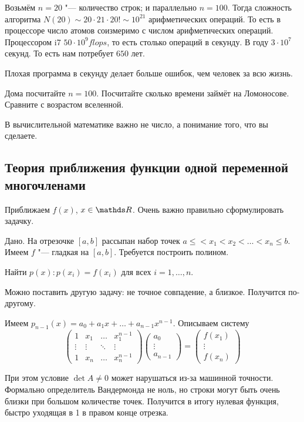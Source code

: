 Возьмём $n=20$ "--- количество строк; и параллельно $n=100$. Тогда сложность алгоритма $N(20)\sim 20\cdot 21\cdot 20! \sim 10^{21}$ арифметических операций. То есть в процессоре число атомов соизмеримо с числом арифметических операций. Процессором i7 $50\cdot 10^9 flops$, то есть столько операций в секунду. В году $3\cdot 10^7$ секунд. То есть нам потребует $650$ лет.

Плохая программа в секунду делает больше ошибок, чем человек за всю жизнь.

Дома посчитайте $n=100$. Посчитайте сколько времени займёт на Ломоносове. Сравните с возрастом вселенной.


В вычислительной математике важно не число, а понимание того, что вы сделаете.

\subsection{Теория приближения функции одной переменной многочленами}
Приближаем $f(x)$, $x\in\R$. Очень важно правильно сформулировать задачку.

Дано. На отрезочке $[a,b]$ рассыпан набор точек $a \le <x_1<x_2<\dots< x_n\le b$. Имеем $f$ "--- гладкая на $[a,b]$. Требуется построить полином.

Найти $p(x)\colon p(x_i) = f(x_i)$ для всех $i=1,\dots,n$.

Можно поставить другую задачу: не точное совпадение, а близкое. Получится по-другому.

Имеем $p_{n-1}(x) = a_0 + a_1 x + \dots + a_{n-1}x^{n-1}$. Описываем систему
\[
  \begin{pmatrix}
  1 & x_1 & \dots &x_1^{n-1} \\
  \vdots & \vdots &\ddots &\vdots \\
  1 & x_n & \dots &x_n^{n-1}
\end{pmatrix}
\begin{pmatrix}
a_0 \\ \vdots \\ a_{n-1}
\end{pmatrix} = 
\begin{pmatrix}
  f(x_1)\\ \vdots\\ f(x_n)
\end{pmatrix}
\]

При этом условие $\det A\ne 0$ может нарушаться из-за машинной точности. Формально определитель Вандермонда не ноль, но строки могут быть очень близки при большом количестве точек. Получится в итогу нулевая функция, быстро уходящая в 1 в правом конце отрезка.

